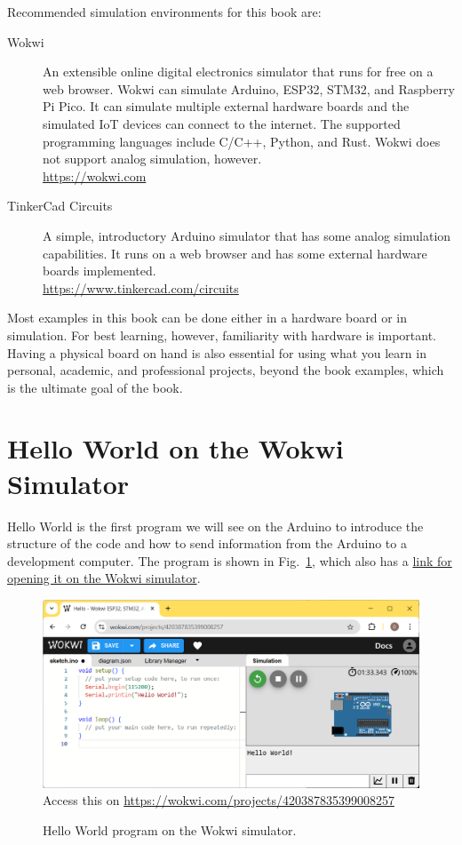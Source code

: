Recommended simulation environments for this book are:
\begin{description}
\item[Wokwi] 
  An extensible online digital electronics simulator that runs for free on a web browser.
  Wokwi can simulate Arduino, ESP32, STM32, and Raspberry Pi Pico.
  It can simulate multiple external hardware boards and the simulated IoT devices can connect to the internet.
  The supported programming languages include C/C++, Python, and Rust.
  Wokwi does not support analog simulation, however.\\
  \url{https://wokwi.com}
\item[TinkerCad Circuits] 
  A simple, introductory Arduino simulator that has some analog simulation capabilities.
  It runs on a web browser and has some external hardware boards implemented.\\
  \url{https://www.tinkercad.com/circuits}
\end{description}

Most examples in this book can be done either in a hardware board or in simulation.
For best learning, however, familiarity with hardware is important.
Having a physical board on hand is also essential for using what you learn in personal, academic, and professional projects, beyond the book examples, which is the ultimate goal of the book.

\section{Hello World on the Wokwi Simulator}

Hello World is the first program we will see on the Arduino to introduce the structure of the code and how to send information from the Arduino to a development computer.
The program is shown in Fig.~\ref{fig:wokwi-hello}, which also has a \href{https://wokwi.com/projects/420387835399008257}{link for opening it on the Wokwi simulator}.

\begin{figure}[b]
  \begin{wide}
    \includegraphics[width=\textwidth]{img/wokwi-hello.png}
    \\ \scriptsize
    Access this on \url{https://wokwi.com/projects/420387835399008257}
    \caption{Hello World program on the Wokwi simulator.}
    \label{fig:wokwi-hello}
  \end{wide}
\end{figure}

